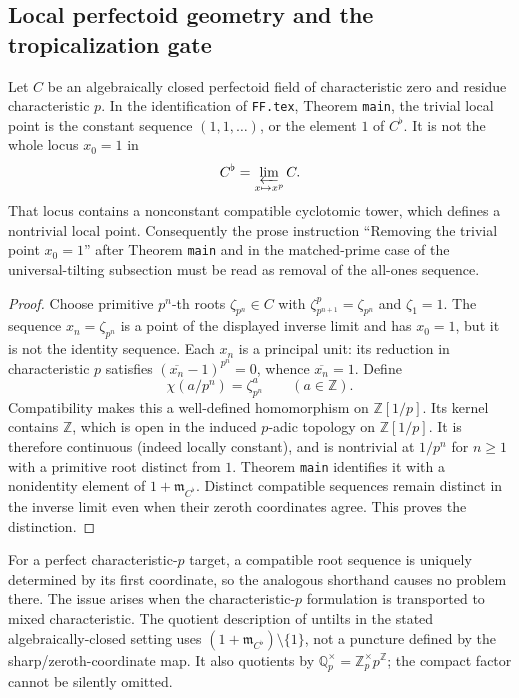 \subsection{Local perfectoid geometry and the tropicalization gate}

\begin{proposition}
\label{AC-G18}
Let $C$ be an algebraically closed perfectoid field of characteristic
zero and residue characteristic $p$.  In the identification of
\texttt{FF.tex}, Theorem \texttt{main}, the trivial local point is the
constant sequence $(1,1,\ldots)$, or the element $1$ of $C^\flat$.
It is not the whole locus $x_0=1$ in
\[
 C^\flat=\varprojlim_{x\mapsto x^p}C.
\]
That locus contains a nonconstant compatible cyclotomic tower, which
defines a nontrivial local point.  Consequently the prose instruction
``Removing the trivial point $x_0=1$'' after Theorem \texttt{main}
and in the matched-prime case of the universal-tilting subsection
must be read as removal of the all-ones sequence.
\end{proposition}
\begin{proof}
Choose primitive $p^n$-th roots $\zeta_{p^n}\in C$ with
$\zeta_{p^{n+1}}^p=\zeta_{p^n}$ and $\zeta_1=1$.
The sequence $x_n=\zeta_{p^n}$ is a point of the displayed inverse
limit and has $x_0=1$, but it is not the identity sequence.
Each $x_n$ is a principal unit: its reduction in characteristic $p$
satisfies $(\overline{x_n}-1)^{p^n}=0$, whence
$\overline{x_n}=1$.  Define
\[
 \chi(a/p^n)=\zeta_{p^n}^{a}\qquad(a\in\mathbb Z).
\]
Compatibility makes this a well-defined homomorphism on
$\mathbb Z[1/p]$.  Its kernel contains $\mathbb Z$, which is open in
the induced $p$-adic topology on $\mathbb Z[1/p]$.  It is therefore
continuous (indeed locally constant), and is nontrivial at $1/p^n$
for $n\geq1$ with a primitive root distinct from $1$.
Theorem \texttt{main} identifies it with a nonidentity element of
$1+\mathfrak m_{C^\flat}$.  Distinct compatible sequences remain
distinct in the inverse limit even when their zeroth coordinates
agree.  This proves the distinction.
\end{proof}

\begin{remark}
For a perfect characteristic-$p$ target, a compatible root sequence
is uniquely determined by its first coordinate, so the analogous
shorthand causes no problem there.  The issue arises when the
characteristic-$p$ formulation is transported to mixed
characteristic.  The quotient description of untilts in the stated
algebraically-closed setting uses
$(1+\mathfrak m_{C^\flat})\setminus\{1\}$, not a puncture defined by
the sharp/zeroth-coordinate map.  It also quotients by
$\mathbb Q_p^\times=\mathbb Z_p^\times p^{\mathbb Z}$; the compact
factor cannot be silently omitted.
\end{remark}

